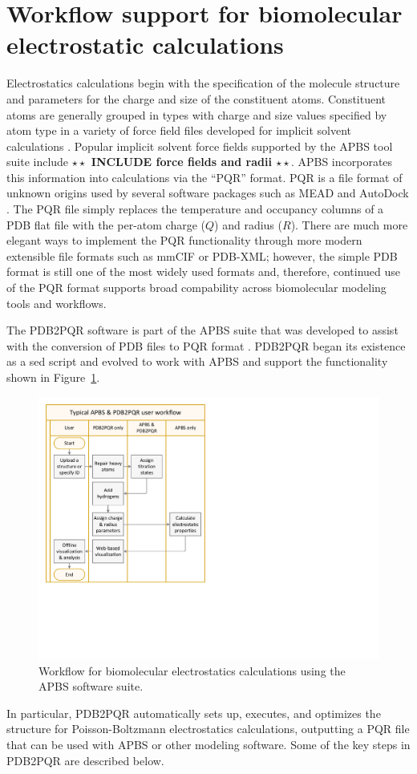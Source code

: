 \documentclass[11pt,titlepage]{article}
\newcommand{\todo}[1]{\textbf{$\star \star$ {#1} $\star \star$}}
\begin{document}
\section{Workflow support for biomolecular electrostatic calculations}
Electrostatics calculations begin with the specification of the molecule structure and parameters for the charge and size of the constituent atoms.
Constituent atoms are generally grouped in types with charge and size values specified by atom type in a variety of force field files developed for implicit solvent calculations \cite{Ren2012}.
Popular implicit solvent force fields supported by the APBS tool suite include \todo{INCLUDE force fields and radii}.
APBS incorporates this information into calculations via the ``PQR'' format.
PQR is a file format of unknown origins used by several software packages such as MEAD \cite{MEAD} and AutoDock \cite{AutoDock}. 
The PQR file simply replaces the temperature and occupancy columns of a PDB flat file \cite{PDB} with the per-atom charge ($Q$) and radius ($R$).
There are much more elegant ways to implement the PQR functionality through more modern extensible file formats such as mmCIF \cite{mmCIF} or PDB-XML; however, the simple PDB format is still one of the most widely used formats and, therefore, continued use of the PQR format supports broad compability across biomolecular modeling tools and workflows.

The PDB2PQR software is part of the APBS suite that was developed to assist with the conversion of PDB files to PQR format \cite{Dolinsky2004, Dolinsky2007}.
PDB2PQR began its existence as a sed \cite{sed} script and evolved to work with APBS and support the functionality shown in Figure~\ref{fig:PDB2PQR-APBS}.
\begin{figure}
	\centering
	\includegraphics[width=0.60\linewidth]{APBS-and-PDB2PQR-user-flow} 
	\caption{Workflow for biomolecular electrostatics calculations using the APBS software suite.}
	\label{fig:PDB2PQR-APBS}
\end{figure}
In particular, PDB2PQR automatically sets up, executes, and optimizes the structure for Poisson-Boltzmann electrostatics calculations, outputting a PQR file that can be used with APBS or other modeling software.
Some of the key steps in PDB2PQR are described below.
\end{document}
